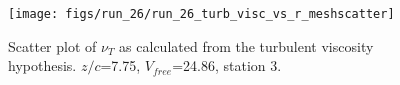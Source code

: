 \begin{figure}[H]
\centering
\texttt{[image: figs/run\_26/run\_26\_turb\_visc\_vs\_r\_meshscatter]}
\caption{Scatter plot of $\nu_T$ as calculated from the turbulent viscosity hypothesis. $z/c$=7.75, $V_{free}$=24.86, station 3.}
\label{fig:run_26_turb_visc_vs_r_meshscatter}
\end{figure}


